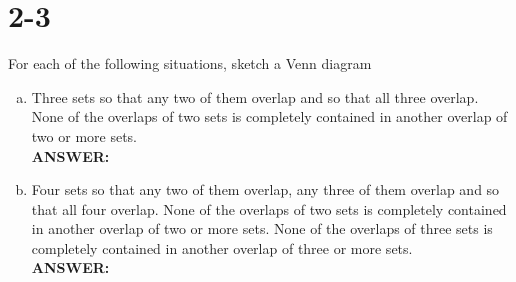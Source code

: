 \documentclass{article}
\begin{document}
\section{2-3}
For each of the following situations, sketch a Venn diagram
\begin{enumerate}[a)]
    \item Three sets so that any two of them overlap and so that all three
        overlap.  None of the overlaps of two sets is completely contained in
        another overlap of two or more sets. \\
        \textbf{ANSWER:} \\
        \begin{center}
        \end{center}

        \newpage

    \item Four sets so that any two of them overlap, any three of them overlap
        and so that all four overlap.  None of the overlaps of two sets is
        completely contained in another overlap of two or more sets.  None of
        the overlaps of three sets is completely contained in another overlap of
        three or more sets. \\
        \textbf{ANSWER:} \\
        \begin{center}
        \end{center}
\end{enumerate}
\end{document}
